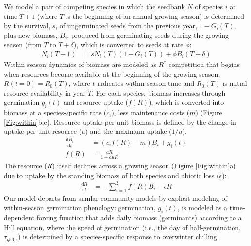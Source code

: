 \documentclass[11pt]{article}
\begin{document}
We model a pair of competing species in which the seedbank $N$ of species $i$ at time $T+1$ (where $T$ is the beginning of an annual  growing season) is determined by the survival, $s$, of ungerminated seeds from the previous year, $1-G_{i}(T)$, plus new biomass, $B_i$, produced from germinating seeds during the growing season (from $T$ to $T + \delta$), which is converted to seeds at rate $\phi$:
\begin{align}
N_{i}(T+1) & =
s N_{i}(T)(1-G_{i}(T))+\phi B_{i}(T+\delta)
\end{align}
Within season dynamics of biomass are modeled as $R^{*}$ competition that begins when resources become available at the beginning of the growing season, $R(t=0) = R_0(T)$, where $t$ indicates within-season time and $R_0(T)$ is initial resource availability in year $T$.  For each species, biomass increases through germination $g_{i}(t)$ and resource uptake ($f(R)$), which is converted into biomass at a species-specific rate ($c_i$), less maintenance costs ($m$) (Figure \ref{Fig:within}b,c).  Resource uptake per unit biomass is defined by the change in uptake per unit resource ($a$) and the maximum uptake ($1/u$).
\begin{align}
\frac{\mathrm{d}B_i}{\mathrm{d}t} & = (c_{i}f(R) - m)B_{i} + g_{i}(t)\\ 
f(R) & = \frac{aR}{1+auR}
\end{align}
The resource ($R$) itself declines across a growing season (Figure \ref{Fig:within}a) due to uptake by the standing biomass of both species and abiotic loss ($\epsilon$):
\begin{align}
\frac{\mathrm{d}R}{\mathrm{d}t} & = - \sum_{i=1}^{2}f(R)B_{i} -\epsilon R
\end{align}
Our model departs from similar community models by explicit modeling of within-season germination phenology: germination, $g_{i}(t)$, is modeled as a time-dependent forcing function that adds daily biomass (germinants) according to a Hill equation, where the speed of germination (i.e., the day of half-germination, $\tau_{g50,i}$) is determined by a species-specific response to overwinter chilling.  
\end{document}
